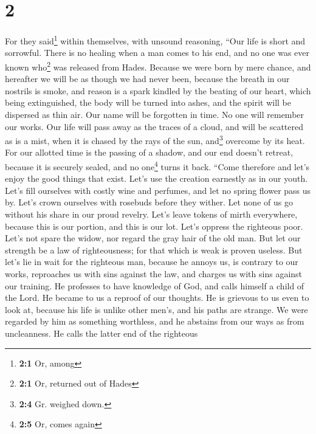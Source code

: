 \hypertarget{section-1}{%
\section{2}\label{section-1}}

 For they said\footnote{\textbf{2:1} Or, among} within
themselves, with unsound reasoning, ``Our life is short and sorrowful.
There is no healing when a man comes to his end, and no one was ever
known who\footnote{\textbf{2:1} Or, returned out of Hades} was released
from Hades.  Because we were born by mere chance, and
hereafter we will be as though we had never been, because the breath in
our nostrils is smoke, and reason is a spark kindled by the beating of
our heart,  which being extinguished, the body will be
turned into ashes, and the spirit will be dispersed as thin air.
 Our name will be forgotten in time. No one will remember
our works. Our life will pass away as the traces of a cloud, and will be
scattered as is a mist, when it is chased by the rays of the sun,
and\footnote{\textbf{2:4} Gr. weighed down.} overcome by its heat.
 For our allotted time is the passing of a shadow, and our
end doesn't retreat, because it is securely sealed, and no
one\footnote{\textbf{2:5} Or, comes again} turns it back. 
``Come therefore and let's enjoy the good things that exist. Let's use
the creation earnestly as in our youth.  Let's fill
ourselves with costly wine and perfumes, and let no spring flower pass
us by.  Let's crown ourselves with rosebuds before they
wither.  Let none of us go without his share in our proud
revelry. Let's leave tokens of mirth everywhere, because this is our
portion, and this is our lot.  Let's oppress the
righteous poor. Let's not spare the widow, nor regard the gray hair of
the old man.  But let our strength be a law of
righteousness; for that which is weak is proven useless. 
But let's lie in wait for the righteous man, because he annoys us, is
contrary to our works, reproaches us with sins against the law, and
charges us with sins against our training.  He professes
to have knowledge of God, and calls himself a child of the Lord.
 He became to us a reproof of our thoughts.
 He is grievous to us even to look at, because his life
is unlike other men's, and his paths are strange.  We
were regarded by him as something worthless, and he abstains from our
ways as from uncleanness. He calls the latter end of the righteous
